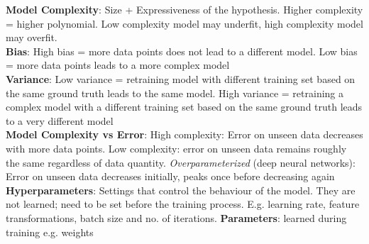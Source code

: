 \documentclass{article}
\begin{document}
{\begin{multicols*}{3}
\textbf{Model Complexity}: Size + Expressiveness of the hypothesis. Higher complexity = higher polynomial. Low complexity model may underfit, high complexity model may overfit. \\
\textbf{Bias}: High bias = more data points does not lead to a different model. Low bias = more data points leads to a more complex model\\
\textbf{Variance}: Low variance = retraining model with different training set based on the same ground truth leads to the same model. High variance = retraining a complex model with a different training set based on the same ground truth leads to a very different model\\
\textbf{Model Complexity vs Error}: High complexity: Error on unseen data decreases with more data points. Low complexity: error on unseen data remains roughly the same regardless of data quantity. \textit{Overparameterized} (deep neural networks): Error on unseen data decreases initially, peaks once before decreasing again\\
\textbf{Hyperparameters}: Settings that control the behaviour of the model. They are not learned; need to be set before the training process. E.g. learning rate, feature transformations, batch size and no. of iterations. \textbf{Parameters}: learned during training e.g. weights 

\end{multicols*}}
\end{document}
